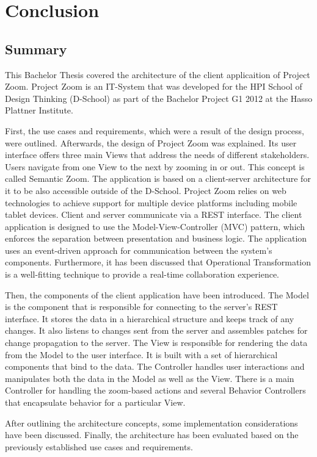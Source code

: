 \chapter{Conclusion}

\section{Summary}
This Bachelor Thesis covered the architecture of the client applicaition of Project Zoom. Project Zoom is an IT-System that was developed for the HPI School of Design Thinking (D-School) as part of the Bachelor Project G1 2012 at the Hasso Plattner Institute.

First, the use cases and requirements, which were a result of the design process, were outlined. Afterwards, the design of Project Zoom was explained. Its user interface offers three main Views that address the needs of different stakeholders. Users navigate from one View to the next by zooming in or out. This concept is called Semantic Zoom. The application is based on a client-server architecture for it to be also accessible outside of the D-School. Project Zoom relies on web technologies to achieve support for multiple device platforms including mobile tablet devices. Client and server communicate via a REST interface. The client application is designed to use the Model-View-Controller (MVC) pattern, which enforces the separation between presentation and business logic. The application uses an event-driven approach for communication between the system's components. Furthermore, it has been discussed that Operational Transformation is a well-fitting technique to provide a real-time collaboration experience. 

Then, the components of the client application have been introduced. The Model is the component that is responsible for connecting to the server's REST interface. It stores the data in a hierarchical structure and keeps track of any changes. It also listens to changes sent from the server and assembles patches for change propagation to the server. The View is responsible for rendering the data from the Model to the user interface. It is built with a set of hierarchical components that bind to the data. The Controller handles user interactions and manipulates both the data in the Model as well as the View. There is a main Controller for handling the zoom-based actions and several Behavior Controllers that encapsulate behavior for a particular View. 

After outlining the architecture concepts, some implementation considerations have been dis\-cuss\-ed. Finally, the architecture has been evaluated based on the previously established use cases and requirements.

